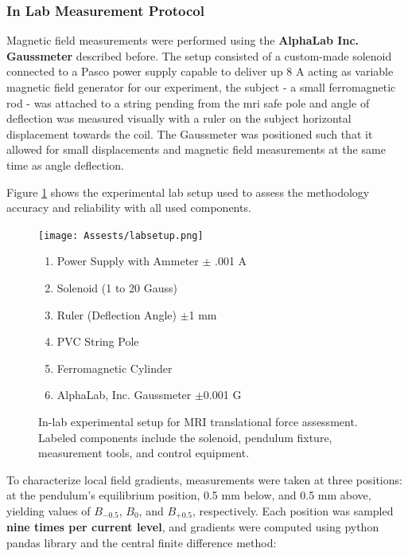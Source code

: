 \subsubsection*{In Lab Measurement Protocol}

Magnetic field measurements were performed using the \textbf{AlphaLab Inc. Gaussmeter} described before. The setup consisted of a custom-made solenoid connected to a Pasco power supply capable to deliver up 8 A acting as variable magnetic field generator for our experiment, the subject - a small ferromagnetic rod - was attached to a string pending from the \gls{mri} safe pole and angle of deflection was measured visually with a ruler on the subject horizontal displacement towards the coil. The Gaussmeter was positioned such that it allowed for small displacements and magnetic field measurements at the same time as angle deflection.

Figure \ref{labsetup} shows the experimental lab setup used to assess the methodology accuracy and reliability with all used components.


\begin{figure}[H]
	\centering
	\begin{minipage}[t]{0.58\textwidth}
		\centering
		\texttt{[image: Assests/labsetup.png]} %
	\end{minipage}%
	\hfill
	\begin{minipage}[t]{0.42\textwidth}
		\footnotesize
		\vspace*{-50ex}
		\begin{enumerate}
			\item Power Supply with Ammeter $\pm$ .001 A 
			\item Solenoid (1 to 20 Gauss)
			\item Ruler (Deflection Angle) $\pm$1 mm 
			\item PVC String Pole
			\item Ferromagnetic Cylinder
			\item AlphaLab, Inc. Gaussmeter $\pm$0.001 G  
		\end{enumerate}
	\end{minipage}
	\caption{In-lab experimental setup for MRI translational force assessment. Labeled components include the solenoid, pendulum fixture, measurement tools, and control equipment.}
	\label{labsetup}
\end{figure}

To characterize local field gradients, measurements were taken at three positions: at the pendulum's equilibrium position, 0.5 mm below, and 0.5 mm above, yielding values of $B_{-0.5}$, $B_0$, and $B_{+0.5}$, respectively. Each position was sampled \textbf{nine times per current level}, and gradients were computed using python pandas library and the central finite difference method:

